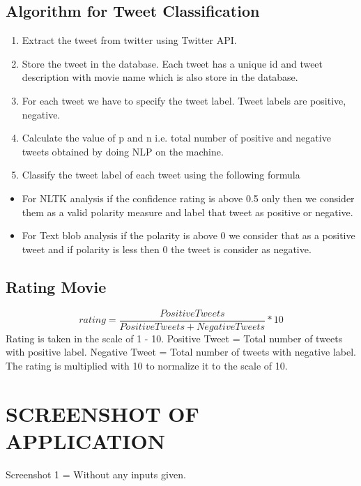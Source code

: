 \documentclass[a4paper]{article}
\begin{document}
\subsection{Algorithm for Tweet Classification}
\begin{enumerate}
\item  Extract the tweet from twitter using Twitter API.
\item  Store the tweet in the database. Each tweet has a unique id
and tweet description with movie name which is also store in the database.
\item  For each tweet we have to specify the tweet label. Tweet
labels are positive, negative.
\item Calculate the value of p and n i.e. total number of positive
and negative tweets obtained by doing NLP on the machine. 
\item  Classify the tweet label of each tweet using the following
formula
\end{enumerate}
\begin{itemize}
\item For NLTK analysis if the confidence rating is above 0.5 only then we consider them as a valid polarity measure and label that tweet as positive or negative.
\item For Text blob analysis if the polarity is above 0 we consider that as a positive tweet and if polarity is less then 0 the tweet is consider as negative.
\end{itemize}
\subsection{Rating Movie}
\[rating = \frac{Positive Tweets}{Positive Tweets + Negative Tweets}  *  10\]
Rating is taken in the scale of 1 - 10.
Positive Tweet = Total number of tweets with positive label.
Negative Tweet = Total number of tweets with negative label.
The rating is multiplied with 10 to normalize it to the scale of 10. 
\section{SCREENSHOT OF APPLICATION}
Screenshot 1 = Without any inputs given.
\end{document}
